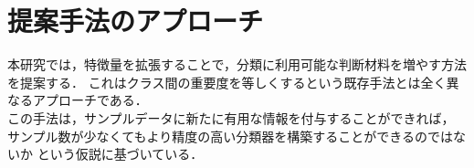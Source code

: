 \section{提案手法のアプローチ}

本研究では，特徴量を拡張することで，分類に利用可能な判断材料を増やす方法を提案する．
これはクラス間の重要度を等しくするという既存手法とは全く異なるアプローチである．\\
この手法は，サンプルデータに新たに有用な情報を付与することができれば，
サンプル数が少なくてもより精度の高い分類器を構築することができるのではないか
という仮説に基づいている．\\

